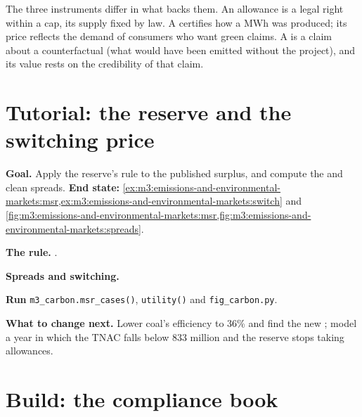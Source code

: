 The three instruments differ in what backs them. An allowance is a legal right within a cap, its
supply fixed by law. A  certifies how a MWh was produced; its price reflects the
demand of consumers who want green claims. A  is a claim about a counterfactual (what
would have been emitted without the project), and its value rests on the credibility of that claim.

\section{Tutorial: the reserve and the switching price}\label{tut:m3:emissions-and-environmental-markets:switch}

\begin{tutorial}
\textbf{Goal.} Apply the reserve's rule to the published surplus, and compute the 
and clean spreads. \textbf{End state:}
\cref{ex:m3:emissions-and-environmental-markets:msr,ex:m3:emissions-and-environmental-markets:switch}
and \cref{fig:m3:emissions-and-environmental-markets:msr,fig:m3:emissions-and-environmental-markets:spreads}.
\begin{tutsteps}
\item \textbf{The rule.} .
\label{lst:m3:emissions-and-environmental-markets:msr}
\item \textbf{Spreads and switching.}
\label{lst:m3:emissions-and-environmental-markets:switch}
\item \textbf{Run} \texttt{m3\_carbon.msr\_cases()}, \texttt{utility()} and \texttt{fig\_carbon.py}.
\end{tutsteps}
\textbf{What to change next.} Lower coal's efficiency to 36\% and find the new ; model
a year in which the TNAC falls below 833 million and the reserve stops taking allowances.
\end{tutorial}

\section{Build: the compliance book}\label{bld:m3:emissions-and-environmental-markets:carbon}


